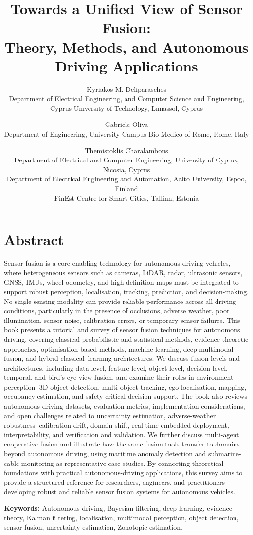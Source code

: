 \documentclass[11pt,oneside,openany]{book}
\title{Towards a Unified View of Sensor Fusion:\\Theory, Methods, and Autonomous Driving Applications}
\author{%
Kyriakos M. Deliparaschos\\
\small Department of Electrical Engineering, and Computer Science and Engineering,\\
\small Cyprus University of Technology, Limassol, Cyprus
\and
Gabriele Oliva\\
\small Department of Engineering, University Campus Bio-Medico of Rome, Rome, Italy
\and
Themistoklis Charalambous\\
\small Department of Electrical and Computer Engineering, University of Cyprus, Nicosia, Cyprus\\
\small Department of Electrical Engineering and Automation, Aalto University, Espoo, Finland\\
\small FinEst Centre for Smart Cities, Tallinn, Estonia
}
\date{}
\begin{document}
\frontmatter
\maketitle

\chapter*{Abstract}
Sensor fusion is a core enabling technology for autonomous driving vehicles, where heterogeneous sensors such as cameras, LiDAR, radar, ultrasonic sensors, GNSS, IMUs, wheel odometry, and high-definition maps must be integrated to support robust perception, localisation, tracking, prediction, and decision-making. No single sensing modality can provide reliable performance across all driving conditions, particularly in the presence of occlusions, adverse weather, poor illumination, sensor noise, calibration errors, or temporary sensor failures. This book presents a tutorial and survey of sensor fusion techniques for autonomous driving, covering classical probabilistic and statistical methods, evidence-theoretic approaches, optimisation-based methods, machine learning, deep multimodal fusion, and hybrid classical--learning architectures. We discuss fusion levels and architectures, including data-level, feature-level, object-level, decision-level, temporal, and bird's-eye-view fusion, and examine their roles in environment perception, 3D object detection, multi-object tracking, ego-localisation, mapping, occupancy estimation, and safety-critical decision support. The book also reviews autonomous-driving datasets, evaluation metrics, implementation considerations, and open challenges related to uncertainty estimation, adverse-weather robustness, calibration drift, domain shift, real-time embedded deployment, interpretability, and verification and validation. We further discuss multi-agent cooperative fusion and illustrate how the same fusion tools transfer to domains beyond autonomous driving, using maritime anomaly detection and submarine-cable monitoring as representative case studies. By connecting theoretical foundations with practical autonomous-driving applications, this survey aims to provide a structured reference for researchers, engineers, and practitioners developing robust and reliable sensor fusion systems for autonomous vehicles.

\medskip
\noindent\textbf{Keywords:} Autonomous driving, Bayesian filtering, deep learning, evidence theory, Kalman filtering, localisation, multimodal perception, object detection, sensor fusion, uncertainty estimation, Zonotopic estimation.
\end{document}
